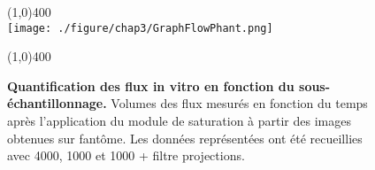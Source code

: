 \begin{figure}[H]
\centering \line(1,0){400} \\
\texttt{[image: ./figure/chap3/GraphFlowPhant.png]}
\caption[Quantification des flux in vitro en fonction du sous-échantillonnage.]{\label{fig:GraphFlowPhant} \textbf{Quantification des flux in vitro en fonction du sous-échantillonnage.} Volumes des flux mesurés en fonction du temps après l'application du module de saturation à partir des images obtenues sur fantôme. Les données représentées ont été recueillies avec 4000, 1000 et 1000 + filtre projections.}
\line(1,0){400} \\ \end{figure}

%
%

